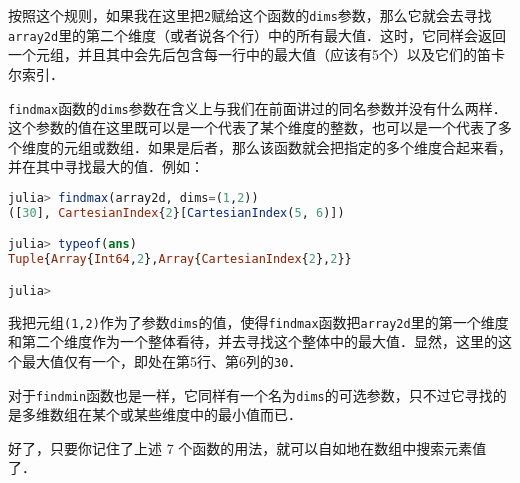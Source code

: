 按照这个规则，如果我在这里把\verb|2|赋给这个函数的\verb|dims|参数，那么它就会去寻找\verb|array2d|里的第二个维度（或者说各个行）中的所有最大值．这时，它同样会返回一个元组，并且其中会先后包含每一行中的最大值（应该有5个）以及它们的笛卡尔索引．

\verb|findmax|函数的\verb|dims|参数在含义上与我们在前面讲过的同名参数并没有什么两样．这个参数的值在这里既可以是一个代表了某个维度的整数，也可以是一个代表了多个维度的元组或数组．如果是后者，那么该函数就会把指定的多个维度合起来看，并在其中寻找最大的值．例如：

\begin{lstlisting}[language=julia]
julia> findmax(array2d, dims=(1,2))
([30], CartesianIndex{2}[CartesianIndex(5, 6)])

julia> typeof(ans)
Tuple{Array{Int64,2},Array{CartesianIndex{2},2}}

julia> 
\end{lstlisting}

我把元组\verb|(1,2)|作为了参数\verb|dims|的值，使得\verb|findmax|函数把\verb|array2d|里的第一个维度和第二个维度作为一个整体看待，并去寻找这个整体中的最大值．显然，这里的这个最大值仅有一个，即处在第5行、第6列的\verb|30|．

对于\verb|findmin|函数也是一样，它同样有一个名为\verb|dims|的可选参数，只不过它寻找的是多维数组在某个或某些维度中的最小值而已．

好了，只要你记住了上述 7 个函数的用法，就可以自如地在数组中搜索元素值了．